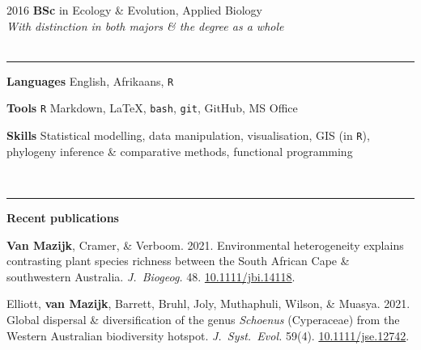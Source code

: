 \documentclass[12pt]{article}
\begin{document}
2016       \hspace{4.25em} \textbf{BSc} in Ecology \& Evolution, Applied Biology \\
           \hspace{6.75em} \textit{With distinction in both majors \& the degree as a whole} \\
\

\hrule %

\bigskip

\textbf{Languages}     \hfill                  English, Afrikaans, \texttt{R}

\textbf{Tools    }     \hfill                            \texttt{R} Markdown,
                                        {\selectfont \LaTeX},
                               \texttt{bash}, \texttt{git}, GitHub, MS Office

\textbf{Skills  }      \hfill Statistical modelling, data manipulation, visualisation, GIS (in \texttt{R}), \\
                       \hfill phylogeny inference \& comparative methods, functional programming

\

\hrule %

\bigskip

\textbf{Recent publications}

\vskip5pt

\textbf{Van Mazijk}, Cramer, \& Verboom. 2021.  Environmental heterogeneity explains contrasting plant species richness between the South African Cape \& southwestern Australia. \textit{J.~Biogeog.} 48. \href{https://doi.org/10.1111/jbi.14118}{10.1111/jbi.14118}.

Elliott, \textbf{van Mazijk}, Barrett, Bruhl, Joly, Muthaphuli, Wilson, \& Muasya. 2021. Global dispersal \& diversification of the genus \textit{Schoenus} (Cyperaceae) from the Western Australian biodiversity hotspot. \textit{J.~Syst.~Evol.} 59(4). \href{https://doi.org/10.1111/jse.1274}{10.1111/jse.12742}.
\end{document}
